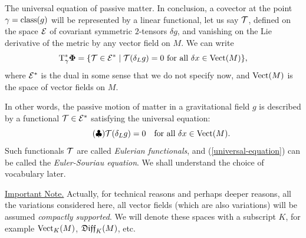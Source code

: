 \begin{Article}{The universal equation of passive matter.}{}
  In conclusion,
  a covector at the point $\gamma = \operatorname{class}(g)$ will be represented by a linear functional,
  let us say $\mathcal{T}$,
  defined on the space $\mathcal{E}$ of covariant symmetric $2$-tensors $\delta g$,
  and vanishing on the Lie derivative of the metric by any vector field on $M$.
  We can write
  $$
    \mathrm{T}^*_\gamma {\mbox{\boldmath $\Phi$}} = \{ \mathcal{T} \in \mathcal{E}^* \mid \mathcal{T}(\delta_L g) = 0 \text{ for all } \delta x \in \operatorname{Vect}(M) \},
  $$
  where $\mathcal{E}^*$ is the dual in some sense that we do not specify now,
  and $\operatorname{Vect}(M)$ is the space of vector fields on $M$.
  
  In other words,
  the passive motion of matter in a gravitational field $g$ is described by a functional $\mathcal{T} \in \mathcal{E}^*$ satisfying the universal equation:
  \begin{equation}\tag{$\clubsuit$}\label{universal-equation}
    \mathcal{T}(\delta_L g) = 0 \quad \text{for all } \delta x \in \operatorname{Vect}(M).
  \end{equation}
  Such functionals $\mathcal{T}$ are called \emph{Eulerian functionals},
  and (\ref{universal-equation}) can be called the \emph{Euler-Souriau equation}.
  We shall understand the choice of vocabulary later.
  
  \uline{Important Note.} Actually,
  for technical reasons and perhaps deeper reasons,
  all the variations considered here,
  all vector fields (which are also variations) will be assumed \emph{compactly supported}.
  We will denote these spaces with a subscript $K$,
  for example $\operatorname{Vect}_K(M)$,
  $\mathfrak{Diff}_K(M)$, etc.
\end{Article}

